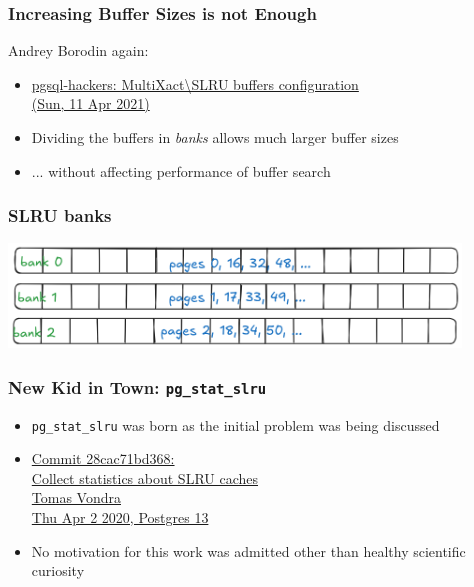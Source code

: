 \begin{frame}
  \frametitle{Increasing Buffer Sizes is not Enough}
  Andrey Borodin again:
  \begin{itemize}
    \item {\linksize \href{https://postgr.es/m/494C5E7F-E410-48FA-A93E-F7723D859561@yandex-team.ru}
      {pgsql-hackers: MultiXact\textbackslash{}SLRU buffers configuration \faExternalLink\\ (Sun, 11 Apr 2021)}}

    \item Dividing the buffers in \emph{banks} allows much larger buffer sizes
    \item ... without affecting performance of buffer search
  \end{itemize}
\end{frame}

\begin{frame}
  \frametitle{SLRU banks}
  \includegraphics[width=0.9\textwidth]{banks.png}
\end{frame}

\begin{frame}
  \frametitle{New Kid in Town: \texttt{pg\_stat\_slru}}
  \begin{itemize}
    \item \texttt{pg\_stat\_slru} was born as the initial problem was being discussed
    \item {\linksize \href{https://git.postgresql.org/cgit/postgresql.git/commit/?id=28cac71bd368}
      {Commit 28cac71bd368: \faExternalLink \\
      Collect statistics about SLRU caches \\
      Tomas Vondra \\
      Thu Apr 2 2020, Postgres 13}}
    \item No motivation for this work was admitted other than healthy scientific curiosity
  \end{itemize}
\end{frame}

